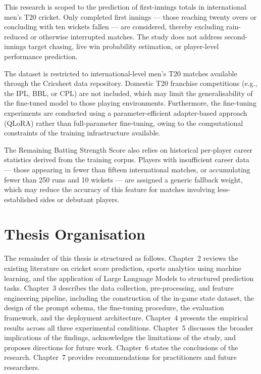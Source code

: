 This research is scoped to the prediction of first-innings totals in international men's T20 cricket. Only completed first innings --- those reaching twenty overs or concluding with ten wickets fallen --- are considered, thereby excluding rain-reduced or otherwise interrupted matches. The study does not address second-innings target chasing, live win probability estimation, or player-level performance prediction.

The dataset is restricted to international-level men's T20 matches available through the Cricsheet data repository. Domestic T20 franchise competitions (e.g., the IPL, BBL, or CPL) are not included, which may limit the generalisability of the fine-tuned model to those playing environments. Furthermore, the fine-tuning experiments are conducted using a parameter-efficient adapter-based approach (QLoRA) rather than full-parameter fine-tuning, owing to the computational constraints of the training infrastructure available.

The Remaining Batting Strength Score also relies on historical per-player career statistics derived from the training corpus. Players with insufficient career data --- those appearing in fewer than fifteen international matches, or accumulating fewer than 250 runs and 10 wickets --- are assigned a generic fallback weight, which may reduce the accuracy of this feature for matches involving less-established sides or debutant players.

\section{Thesis Organisation}

The remainder of this thesis is structured as follows. Chapter~2 reviews the existing literature on cricket score prediction, sports analytics using machine learning, and the application of Large Language Models to structured prediction tasks. Chapter~3 describes the data collection, pre-processing, and feature engineering pipeline, including the construction of the in-game state dataset, the design of the prompt schema, the fine-tuning procedure, the evaluation framework, and the deployment architecture. Chapter~4 presents the empirical results across all three experimental conditions. Chapter~5 discusses the broader implications of the findings, acknowledges the limitations of the study, and proposes directions for future work. Chapter~6 states the conclusions of the research. Chapter~7 provides recommendations for practitioners and future researchers.
